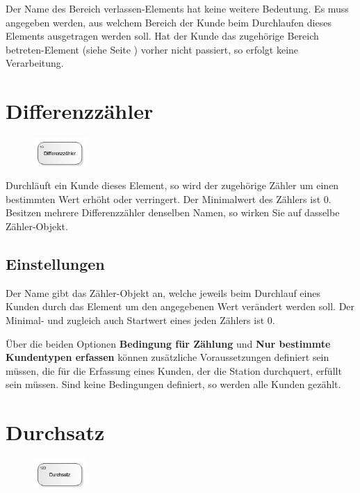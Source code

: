 Der Name des Bereich verlassen-Elements hat keine weitere Bedeutung.
Es muss angegeben werden, aus welchem Bereich der Kunde beim Durchlaufen dieses
Elements ausgetragen werden soll. Hat der Kunde das zugehörige
Bereich betreten-Element (siehe Seite \pageref{ref:ModelElementSectionStart}) 
vorher nicht passiert, so erfolgt keine Verarbeitung.


\section{Differenzzähler}
\label{ref:ModelElementDifferentialCounter}

\begin{figure}
\vspace{-22pt}
\includegraphics[width=2cm]{imageModelElementDifferentialCounter.png}
\vspace{-22pt}
\end{figure}

Durchläuft ein Kunde dieses Element, so wird der zugehörige Zähler um einen bestimmten Wert erhöht oder verringert.
Der Minimalwert des Zählers ist 0. Besitzen mehrere Differenzzähler denselben Namen, so wirken Sie auf dasselbe
Zähler-Objekt.

\subsection*{Einstellungen}

Der Name gibt das Zähler-Objekt an, welche jeweils beim Durchlauf eines Kunden durch das Element um den
angegebenen Wert verändert werden soll. Der Minimal- und zugleich auch Startwert eines jeden Zählers ist 0.

Über die beiden Optionen \textbf{Bedingung für Zählung} und \textbf{Nur bestimmte Kundentypen erfassen} können zusätzliche
Voraussetzungen definiert sein müssen, die für die Erfassung eines Kunden, der die Station durchquert, erfüllt sein müssen.
Sind keine Bedingungen definiert, so werden alle Kunden gezählt.


\section{Durchsatz}
\label{ref:ModelElementThroughput}

\begin{figure}
\vspace{-22pt}
\includegraphics[width=2cm]{imageModelElementThroughput.png}
\vspace{-22pt}
\end{figure}

